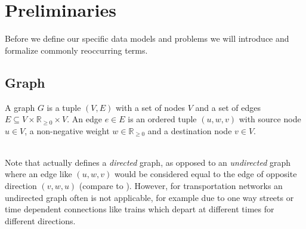 \section{Preliminaries}\label{preliminaries}
	Before we define our specific data models and problems we will introduce and formalize commonly reoccurring terms.

\subsection{Graph}
	\begin{mydef}\label{graph}
		A \textnormal{graph} $G$ is a tuple $(V, E)$ with a set of nodes $V$ and a set of
		edges $E \subseteq V \times \mathbb{R}_{\ge 0} \times V$.
		An \textnormal{edge} $e \in E$ is an ordered tuple $(u, w, v)$ with source node $u \in V$, a non-negative
		weight $w \in \mathbb{R}_{\ge 0}$ and a destination node $v \in V$.
	\end{mydef}\quad\\
	Note that  actually defines a \textit{directed} graph, as opposed to an \textit{undirected} graph where an
	edge like $(u, w, v)$ would be considered equal to the edge of opposite direction $(v, w, u)$ (compare to ).
	However, for transportation networks an undirected graph often is not applicable, for example due to one way streets or
	time dependent connections like trains which depart at different times for different directions.
	
